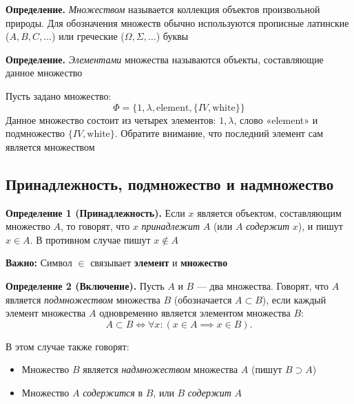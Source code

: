 \documentclass[a4paper,12pt]{article}
\theoremstyle{definition}
\theoremstyle{plain}
\theoremstyle{remark}
\begin{document}
	\noindent \textbf{Определение.} \textit{Множеством} называется коллекция объектов произвольной природы. 
	Для обозначения множеств обычно используются прописные латинские ($A, B, C, \dots$) или греческие ($\Omega, \Sigma, \dots$) буквы
	
	\medskip
	
	\noindent \textbf{Определение.} \textit{Элементами} множества называются объекты, составляющие данное множество
	
	\medskip
	\begin{tcolorbox}[colback=gray!5, colframe=gray!50, title=Пример множества]
		Пусть задано множество:
		\[ \Phi = \{1, \lambda, \text{element}, \{IV, \text{white}\}\} \]
		Данное множество состоит из четырех элементов: $1, \lambda$, слово «element» и подмножество $\{IV, \text{white}\}$. Обратите внимание, что последний элемент сам является множеством
	\end{tcolorbox}
	
	\subsection{Принадлежность, подмножество и надмножество}
	
	\noindent \textbf{Определение 1 (Принадлежность).} 
	Если $x$ является объектом, составляющим множество $A$, то говорят, что $x$ \textit{принадлежит} $A$ (или $A$ \textit{содержит} $x$), и пишут $x \in A$. В противном случае пишут $x \notin A$
	
	\smallskip
	\begin{tcolorbox}[colback=yellow!5, colframe=orange!50, size=small]
		\textbf{Важно:} Символ $\in$ связывает \textbf{элемент} и \textbf{множество}
	\end{tcolorbox}
	
	\medskip
	
	\noindent \textbf{Определение 2 (Включение).} 
	Пусть $A$ и $B$ — два множества. Говорят, что $A$ является \textit{подмножеством} множества $B$ (обозначается $A \subset B$), если каждый элемент множества $A$ одновременно является элементом множества $B$:
	\[
	A \subset B \iff \forall x \colon (x \in A \implies x \in B).
	\]
	
	\smallskip
	В этом случае также говорят:
	\begin{itemize}
		\item Множество $B$ является \textit{надмножеством} множества $A$ (пишут $B \supset A$)
		\item Множество $A$ \textit{содержится} в $B$, или $B$ \textit{содержит} $A$
	\end{itemize}
	
\end{document}
